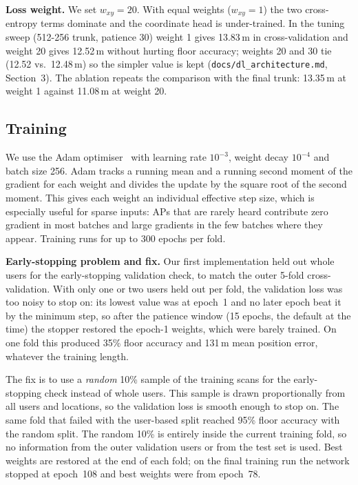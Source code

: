 \documentclass[conference]{IEEEtran}
\begin{document}
\textbf{Loss weight.} We set $w_{xy} = 20$. With equal weights ($w_{xy} = 1$) the two
cross-entropy terms dominate and the coordinate head is under-trained. In the tuning sweep
(512-256 trunk, patience 30) weight 1 gives 13.83\,m in cross-validation and weight 20 gives
12.52\,m without hurting floor accuracy; weights 20 and 30 tie (12.52 vs.\ 12.48\,m) so the
simpler value is kept (\texttt{docs/dl\_architecture.md}, Section~3). The ablation repeats the
comparison with the final trunk: 13.35\,m at weight 1 against 11.08\,m at weight 20.

\subsection{Training}

We use the Adam optimiser~\cite{kingma2015adam} with learning rate $10^{-3}$, weight decay
$10^{-4}$ and batch size 256. Adam tracks a running mean and a running second moment of the gradient for each
weight and divides the update by the square root of the second moment. This gives each weight an
individual effective step size, which is especially useful for sparse inputs: APs that are rarely
heard contribute zero gradient in most batches and large gradients in the few batches where they
appear. Training runs for up to 300 epochs per fold.

\textbf{Early-stopping problem and fix.} Our first implementation held out whole users for the
early-stopping validation check, to match the outer 5-fold cross-validation. With only one or two
users held out per fold, the validation loss was too noisy to stop on: its lowest value was at
epoch~1 and no later epoch beat it by the minimum step, so after the patience window (15 epochs, the default at the time) the
stopper restored the epoch-1 weights, which were barely trained. On one fold this produced 35\%
floor accuracy and 131\,m mean position error, whatever the training length.

The fix is to use a \emph{random} 10\% sample of the training scans for the early-stopping check
instead of whole users. This sample is drawn proportionally from all users and locations, so the
validation loss is smooth enough to stop on. The same fold that failed with
the user-based split reached 95\% floor accuracy with the random split. The random 10\% is
entirely inside the current training fold, so no information from the outer validation users or
from the test set is used. Best weights are restored at the end of each fold; on the final
training run the network stopped at epoch~108 and best weights were from epoch~78.
\end{document}
